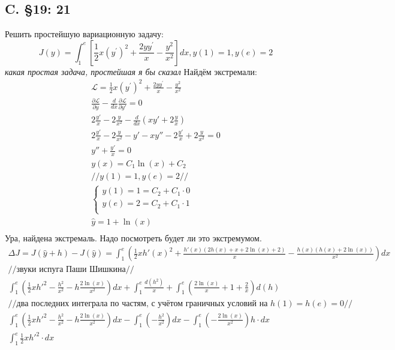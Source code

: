 \documentclass{article}
\newcommand{\Lagr}{\mathcal{L}}
\begin{document}
\subsection{C. \S19: 21}
Решить простейшую вариационную задачу:
\begin{equation}\label{19.21}
J(y)=\int_{1}^{e}\left[\frac{1}{2} x\left(y^{\prime}\right)^{2}+\frac{2 y y^{\prime}}{x}-\frac{y^{2}}{x^{2}}\right] d x, y(1)=1, y(e)=2
\end{equation}
\textcolor[rgb]{0.480469,0.566406,0.480469}{\textit{какая простая задача, простейшая я бы сказал}}
Найдём экстремали:
\begin{gather*}
\Lagr= \frac{1}{2} x\left(y^{\prime}\right)^{2}+\frac{2 y y^{\prime}}{x}-\frac{y^{2}}{x^{2}}\\
\frac{\partial \Lagr}{\partial y}  - \frac{d }{d x} \frac{\partial \Lagr}{\partial y'} =0   \\
2 \frac{y'}{x} - 2 \frac{y}{x^2} - \frac{d}{dx}\left(xy' +2\frac{y}{x} \right)                                      \\
2 \frac{y'}{x} - 2 \frac{y}{x^2} - y' - xy'' - 2 \frac{y'}{x}+2 \frac{y}{x^2}=0\\
y''+\frac{y'}{x}=0\\
y(x)=C_1 \ln(x)+C_2\\
//y(1)=1, y(e)=2//\\
\begin{cases}
    y(1)=1=C_2 + C_1 \cdot 0\\
    y(e)=2=C_2 + C_1 \cdot 1\\
\end{cases}\\
    \hat y=1+\ln(x)\\
\end{gather*} 
Ура, найдена экстремаль. Надо посмотреть будет ли это экстремумом.
\begin{gather*}
\Delta J = J(\hat y + h) - J(\hat y) = \int_1^e \left(\frac{1}{2} x h'(x)^2+\frac{h'(x) (2 h(x)+x+2 \ln (x)+2)}{x}-\frac{h(x) (h(x)+2 \ln (x))}{x^2}\right)  dx  \\
//\text{звуки испуга Паши Шишкина}//    \\
\int_1^e   \left(\frac{1}{2}x h'^2 - \frac{h^2}{x^2} -h \frac{2\ln(x)}{x^2} \right) dx + 
\int_1^e \frac{d(h^2)}{x}+
\int_1^e \left(\frac{2\ln(x)}{x} + 1 + \frac{2}{x} \right) d(h)  \\
//\text{два последних интеграла по частям, с учётом граничных условий на } h(1)=h(e)=0//\\
\int_1^e   \left(\frac{1}{2}x h'^2 - \frac{h^2}{x^2} -h \frac{2\ln(x)}{x^2} \right) dx -
\int_1^e \left(- \frac{h^2}{x^2} \right)dx -
\int_1^e \left( -\frac{2 \ln(x)}{x^2} \right) h \cdot dx\\
\int_1^e\frac{1}{2}x h'^2 \cdot dx
\end{gather*}      
\end{document}
